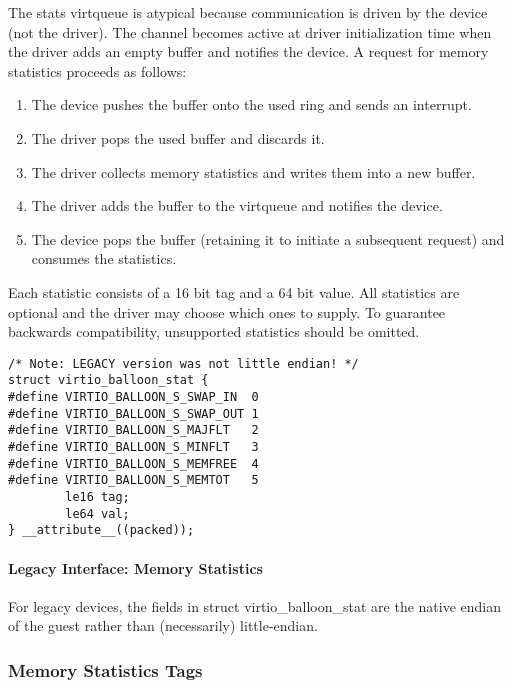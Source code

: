 The stats virtqueue is atypical because communication is driven
by the device (not the driver). The channel becomes active at
driver initialization time when the driver adds an empty buffer
and notifies the device. A request for memory statistics proceeds
as follows:

\begin{enumerate}
\item The device pushes the buffer onto the used ring and sends an
  interrupt.

\item The driver pops the used buffer and discards it.

\item The driver collects memory statistics and writes them into a
  new buffer.

\item The driver adds the buffer to the virtqueue and notifies the
  device.

\item The device pops the buffer (retaining it to initiate a
  subsequent request) and consumes the statistics.
\end{enumerate}

  Each statistic consists of a 16 bit
  tag and a 64 bit value. All statistics are optional and the
  driver may choose which ones to supply. To guarantee backwards
  compatibility, unsupported statistics should be omitted.

\begin{lstlisting}
/* Note: LEGACY version was not little endian! */
struct virtio_balloon_stat {
#define VIRTIO_BALLOON_S_SWAP_IN  0
#define VIRTIO_BALLOON_S_SWAP_OUT 1
#define VIRTIO_BALLOON_S_MAJFLT   2
#define VIRTIO_BALLOON_S_MINFLT   3
#define VIRTIO_BALLOON_S_MEMFREE  4
#define VIRTIO_BALLOON_S_MEMTOT   5
        le16 tag;
        le64 val;
} __attribute__((packed));
\end{lstlisting}

\paragraph{Legacy Interface: Memory Statistics}\label{sec:Device Types / Memory Balloon Device / Device Operation / Memory Statistics / Legacy Interface: Memory Statistics}
For legacy devices, the fields in struct virtio_balloon_stat are the
native endian of the guest rather than (necessarily) little-endian.


\subsubsection{Memory Statistics Tags}\label{sec:Device Types / Memory Balloon Device / Device Operation / Memory Statistics Tags}

